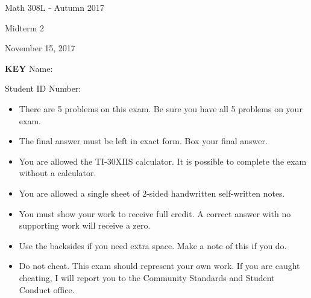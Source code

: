\documentclass[addpoints]{exam}
\begin{document}
\begin{center}
Math 308L - Autumn 2017

Midterm 2

November 15, 2017
\end{center}

\ifprintanswers
\textbf{\huge KEY}
\else
Name: \hrulefill

Student ID Number: \hrulefill
\fi

\vspace{0.3cm}

\begin{center}
    \gradetable[v][questions]
\end{center}

\vspace{0.3cm}

\begin{itemize}
    \item
        There are 5 problems on this exam. Be sure you have all 5 problems on
        your exam.
    \item
        The final answer must be left in exact form. Box your final answer.
    \item
        You are allowed the TI-30XIIS calculator. It is possible to complete
        the exam without a calculator.
    \item
        You are allowed a single sheet of 2-sided handwritten self-written notes.
    \item
        You must show your work to receive full credit. A correct answer
        with no supporting work will receive a zero.
    \item
        Use the backsides if you need extra space. Make a note of this if you
        do.
    \item
        Do not cheat. This exam should represent your own work. If you are
        caught cheating, I will report you to the Community Standards and
        Student Conduct office.
\end{itemize}
\end{document}
